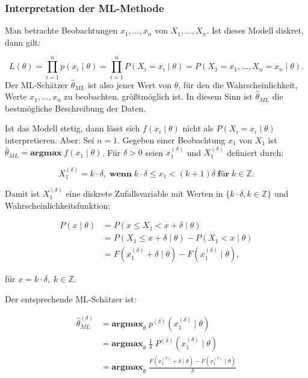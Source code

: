 \documentclass[10pt]{article}
\newcommand{\FZV}{X_1, \ldots, X_n} %
\newcommand{\xt}{x \mid \theta} %
\begin{document}
	\subsubsection{Interpretation der ML-Methode}
	Man betrachte Beobachtungen $x_1, \ldots , x_n$ von $\FZV$. Ist dieses Modell diskret, dann gilt: 
	
	\begin{equation*}
		L(\theta)=\prod_{i=1}^{n} p(x_i \mid \theta) = \prod_{i=1}^{n} P (X_i = x_i \mid \theta) = P(X_1 = x_1, \ldots, X_n = x_n \mid \theta).
	\end{equation*}
	Der ML-Schätzer $\hat{\theta}_{ML}$ ist also jener Wert von $\theta$, für den die Wahrscheinlichkeit, Werte $x_1,\ldots,x_n$ zu beobachten, größtmöglich ist. In diesem Sinn ist $\hat{\theta}_{ML}$ die bestmögliche Beschreibung der Daten.
	
	Ist das Modell stetig, dann lässt sich $f(x_i \mid \theta)$ nicht als $P(X_i = x_i \mid \theta)$ interpretieren. Aber: Sei $n=1$. Gegeben einer Beobachtung  $x_1$ von $X_1$ ist $\hat{\theta}_{ML} = \textbf{argmax} \; f(x_1 \mid \theta)$. Für $\delta > 0$ seien $x^{\left(\delta\right)}_1$ und $X^{\left(\delta\right)}_1$ definiert durch: 
	
	\begin{equation*}
		X^{\left(\delta\right)}_1 = k \cdot \delta, \;\textbf{wenn} \; k\cdot\delta \leq x_1 < (k+1)\delta \; \textbf{für} \; k \in \mathbb{Z}.
	\end{equation*}
	
	Damit ist $X^{\left(\delta\right)}_1$ eine diskrete Zufallsvariable mit Werten in $\{k\cdot\delta, k\in \mathbb{Z}\}$ und Wahrscheinlichkeitsfunktion:
	
	\begin{equation*}
		\begin{split}
			P(\xt) &= P (x\leq X_1 < x+ \delta \mid \theta) \\
			&= P (X_1 \leq x + \delta \mid \theta) - P (X_1 < x \mid \theta) \\
			&= F(x^{\left(\delta\right)}_1 + \delta \mid \theta) - F(x^{\left(\delta\right)}_1 \mid \theta),
		\end{split}
	\end{equation*}
	
	für $x = k \cdot \delta, \; k \in \mathbb{Z}$.
	
	Der entsprechende ML-Schätzer ist:
	
	\begin{equation*}
		\begin{split}
			\hat{\theta}_{ML}^{\left(\delta\right)} &= \textbf{argmax}_\theta  \; p^{\left(\delta\right)} (x^{\left(\delta\right)}_1 \mid \theta)\\
			&= \textbf{argmax}_\theta \; \frac{1}{\delta} \; P^{\left(\delta\right)} (x^{\left(\delta\right)}_1 \mid \theta)\\
			&= \textbf{argmax}_\theta \; \frac{F(x^{\left(\delta\right)}_1 + \delta \mid \theta) - F(x^{\left(\delta\right)}_1 \mid \theta)}{\delta}
		\end{split}
	\end{equation*}
	
\end{document}
